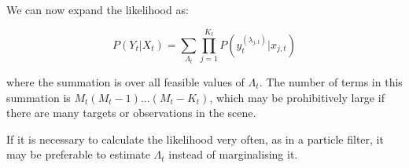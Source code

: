 We can now expand the likelihood as:

\begin{equation}
P(Y_t|X_t) = \sum_{\Lambda_t} \prod_{j=1}^{K_t} P(y_t^{(\lambda_{j,t})}|x_{j,t})
\label{eq:}
\end{equation}

where the summation is over all feasible values of $\Lambda_t$. The number of terms in this summation is $M_t (M_t-1) ... (M_t-K_t)$, which may be prohibitively large if there are many targets or observations in the scene.

If it is necessary to calculate the likelihood very often, as in a particle filter, it may be preferable to estimate $\Lambda_t$ instead of marginalising it.